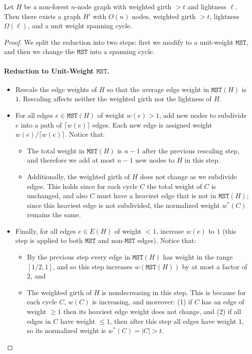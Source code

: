 \documentclass{theoretics}
\newcommand{\mst}{\texttt{MST}}
\begin{document}
\begin{lemma}
Let $H$ be a non-forest $n$-node graph with weighted girth $>t$ and lightness $\ell$.
Then there exists a graph $H'$ with $O(n)$ nodes, weighted girth $>t$, lightness $\Omega(\ell)$, and a unit weight spanning cycle.
\end{lemma}
\begin{proof}
We split the reduction into two steps: first we modify to a unit-weight $\mst$, and then we change the $\mst$ into a spanning cycle.

\paragraph{Reduction to Unit-Weight $\mst$.}

\begin{itemize}
\item Rescale the edge weights of $H$ so that the average edge weight in $\mst(H)$ is $1$.
Rescaling affects neither the weighted girth nor the lightness of $H$.

\item For all edges $e \in \mst(H)$ of weight $w(e) > 1$, add new nodes to subdivide $e$ into a path of $\lceil w(e) \rceil$ edges.
Each new edge is assigned weight $w(e) / \lceil w(e) \rceil$.
Notice that:
\begin{itemize}
\item The total weight in $\mst(H)$ is $n-1$ after the previous rescaling step, and therefore we add at most $n-1$ new nodes to $H$ in this step.

\item Additionally, the weighted girth of $H$ does not change as we subdivide edges.
This holds since for each cycle $C$ the total weight of $C$ is unchanged, and also $C$ must have a heaviest edge that is not in $\mst(H)$; since this heaviest edge is not subdivided, the normalized weight $w^*(C)$ remains the same.
\end{itemize}

\item Finally, for all edges $e \in E(H)$ of weight $< 1$, increase $w(e)$ to $1$ (this step is applied to both $\mst$ and non-$\mst$ edges).
Notice that:
\begin{itemize}
\item By the previous step every edge in $\mst(H)$ has weight in the range $[1/2, 1]$, and so this step increases $w(\mst(H))$ by at most a factor of $2$, and

\item The weighted girth of $H$ is nondecreasing in this step.
This is because for each cycle $C$, $w(C)$ is increasing, and moreover: (1) if $C$ has an edge of weight $\ge 1$ then its heaviest edge weight does not change, and (2) if all edges in $C$ have weight $\le 1$, then after this step all edges have weight $1$, so its normalized weight is $w^*(C) = |C| > t$. 
\end{itemize}
\end{itemize}



\end{proof}
\end{document}
